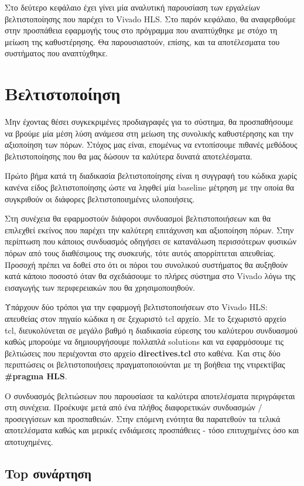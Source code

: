 Στο δεύτερο κεφάλαιο έχει γίνει μία αναλυτική παρουσίαση των εργαλείων βελτιστοποίησης που παρέχει το Vivado HLS. Στο παρόν κεφάλαιο, θα αναφερθούμε στην προσπάθεια εφαρμογής τους στο πρόγραμμα που αναπτύχθηκε με στόχο τη μείωση της καθυστέρησης. Θα παρουσιαστούν, επίσης, και τα αποτέλεσματα του συστήματος που αναπτύχθηκε.
\section{Βελτιστοποίηση}

Μην έχοντας θέσει συγκεκριμένες προδιαγραφές για το σύστημα, θα προσπαθήσουμε να βρούμε μία μέση λύση ανάμεσα στη μείωση της συνολικής καθυστέρησης και την αξιοποίηση των πόρων. Στόχος μας είναι, επομένως να εντοπίσουμε πιθανές μεθόδους βελτιστοποίησης που θα μας δώσουν τα καλύτερα δυνατά αποτελέσματα.

Πρώτο βήμα κατά τη διαδικασία βελτιστοποίησης είναι η συγγραφή του κώδικα χωρίς κανένα είδος βελτιστοποίησης ώστε να ληφθεί μία baseline μέτρηση με την οποία θα συγκριθούν οι διάφορες βελτιστοποιημένες υλοποιήσεις.

Στη συνέχεια θα εφαρμοστούν διάφοροι συνδυασμοί βελτιστοποιήσεων και θα επιλεχθεί εκείνος που παρέχει την καλύτερη επιτάχυνση και αξιοποίηση πόρων. Στην περίπτωση που κάποιος συνδυασμός οδηγήσει σε κατανάλωση περισσότερων φυσικών πόρων από τους διαθέσιμους της συσκευής, τότε αυτός απορρίπτεται απευθείας. Προσοχή πρέπει να δοθεί στο ότι οι πόροι του συνολικού συστήματος θα αυξηθούν κατά κάποιο ποσοστό όταν θα σχεδιάσουμε το πλήρες σύστημα στο Vivado λόγω της εισαγωγής των περιφερειακών που θα χρησιμοποιηθούν.

Υπάρχουν δύο τρόποι για την εφαρμογή βελτιστοποιήσεων στο Vivado HLS: απευθείας στον πηγαίο κώδικα η σε ξεχωριστό tcl αρχείο. Με το ξεχωριστό αρχείο tcl, διευκολύνεται σε μεγάλο βαθμό η διαδικασία εύρεσης του καλύτερου συνδυασμού καθώς μπορούμε να δημιουργήσουμε πολλαπλά solutions και να εφαρμόσουμε τις βελτιώσεις που περιέχονται στο αρχείο \textbf{directives.tcl} στο καθένα. Και στις δύο περιπτώσεις οι βελτιστοποιήσεις πραγματοποιούνται με τη βοήθεια της ντιρεκτίβας \textbf{\#pragma HLS}.

Ο συνδυασμός βελτιώσεων που παρουσίασε τα καλύτερα αποτελέσματα περιγράφεται στη συνέχεια. Προέκυψε μετά από ένα πλήθος διαφορετικών συνδυασμών / προσεγγίσεων και προσπαθειών. Στην επόμενη ενότητα θα παρατεθούν τα τελικά αποτελέσματα καθώς και μερικές ενδιάμεσες προσπάθειες - τόσο επιτυχημένες όσο και αποτυχημένες.
\subsection{Top συνάρτηση}

